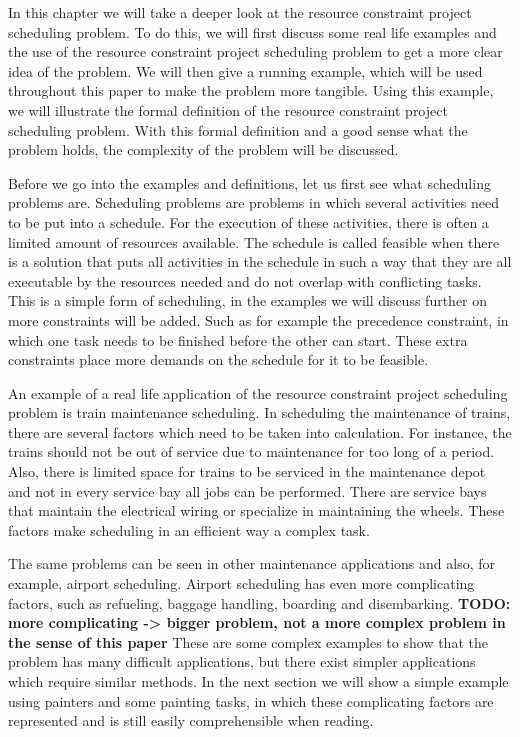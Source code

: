 \documentclass{article}
\theoremstyle{definition}
\newcommand{\TODO}[1]{{\color{red}\textbf{TODO: #1}}}
\begin{document}
In this chapter we will take a deeper look at the resource constraint project scheduling problem.
To do this, we will first discuss some real life examples and the use of the resource constraint project scheduling problem to get a more clear idea of the problem.
We will then give a running example, which will be used throughout this paper to make the problem more tangible.
Using this example, we will illustrate the formal definition of the resource constraint project scheduling problem.
With this formal definition and a good sense what the problem holds, the complexity of the problem will be discussed.

Before we go into the examples and definitions, let us first see what scheduling problems are.
Scheduling problems are problems in which several activities need to be put into a schedule.
For the execution of these activities, there is often a limited amount of resources available.
The schedule is called feasible when there is a solution that puts all activities in the schedule in such a way that they are all executable by the resources needed and do not overlap with conflicting tasks.
This is a simple form of scheduling, in the examples we will discuss further on more constraints will be added.
Such as for example the precedence constraint, in which one task needs to be finished before the other can start.
These extra constraints place more demands on the schedule for it to be feasible.

An example of a real life application of the resource constraint project scheduling problem is train maintenance scheduling.
In scheduling the maintenance of trains, there are several factors which need to be taken into calculation.
For instance, the trains should not be out of service due to maintenance for too long of a period.
Also, there is limited space for trains to be serviced in the maintenance depot and not in every service bay all jobs can be performed.
There are service bays that maintain the electrical wiring or specialize in maintaining the wheels.
These factors make scheduling in an efficient way a complex task.

The same problems can be seen in other maintenance applications and also, for example, airport scheduling.
Airport scheduling has even more complicating factors, such as refueling, baggage handling, boarding and disembarking. \TODO{more complicating -> bigger problem, not a more complex problem in the sense of this paper}
These are some complex examples to show that the problem has many difficult applications, but there exist simpler applications which require similar methods.
In the next section we will show a simple example using painters and some painting tasks, in which these complicating factors are represented and is still easily comprehensible when reading.
\end{document}
